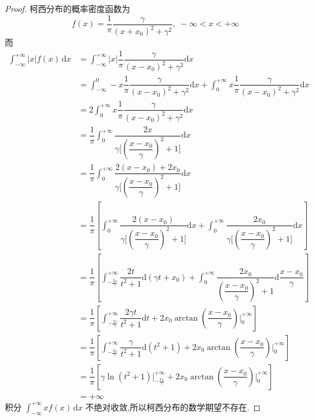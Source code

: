 \begin{proof}
    柯西分布的概率密度函数为
    $$
    f(x) = \dfrac{1}{\pi} \dfrac{\gamma}{(x + x_0)^2 + \gamma^2},\; -\infty < x < +\infty
    $$
    而
    $$
    \begin{aligned}
        \int_{-\infty}^{+\infty} |x| f(x)\,\text{d}x &= \int_{-\infty}^{+\infty} |x| \dfrac{1}{\pi} \dfrac{\gamma}{(x - x_0)^2 + \gamma^2} \text{d}x \\
        &= \int_{-\infty}^{0} -x \dfrac{1}{\pi} \dfrac{\gamma}{(x - x_0)^2 + \gamma^2} \text{d}x + \int_{0}^{+\infty} x \dfrac{1}{\pi} \dfrac{\gamma}{(x - x_0)^2 + \gamma^2} \text{d}x \\
        &= 2 \int_{0}^{+\infty} x \dfrac{1}{\pi} \dfrac{\gamma}{(x - x_0)^2 + \gamma^2} \text{d}x \\
        &= \dfrac{1}{\pi} \int_{0}^{+\infty} \dfrac{2x}{\gamma \big[(\dfrac{x - x_0}{\gamma})^2 + 1 \big]} \text{d}x \\
        &= \dfrac{1}{\pi} \int_{0}^{+\infty} \dfrac{2(x - x_0) + 2x_0}{\gamma \big[(\dfrac{x - x_0}{\gamma})^2 + 1 \big]} \text{d}x \\
        &= \dfrac{1}{\pi} \left[ \int_{0}^{+\infty} \dfrac{2(x - x_0)}{\gamma \big[ (\dfrac{x - x_0}{\gamma})^2 + 1 \big]} \text{d}x + \int_{0}^{+\infty} \dfrac{2x_0}{\gamma \big[(\dfrac{x - x_0}{\gamma})^2 + 1 \big]} \text{d}x \right] \\
        &= \dfrac{1}{\pi} \left[ \int_{-\frac{x_0}{\gamma}}^{+\infty} \dfrac{2t}{t^2 + 1} \text{d}(\gamma t + x_0) + \int_{0}^{+\infty} \dfrac{2x_0}{(\dfrac{x - x_0}{\gamma})^2 + 1} \text{d} \dfrac{x - x_0}{\gamma} \right] \\
        &= \dfrac{1}{\pi} \left[ \int_{-\frac{x_0}{\gamma}}^{+\infty} \dfrac{2 \gamma t}{t^2 + 1} \text{d}t + 2x_0 \arctan(\dfrac{x - x_0}{\gamma}) \Big|_0^{+\infty} \right] \\
        &= \dfrac{1}{\pi} \left[ \int_{-\frac{x_0}{\gamma}}^{+\infty} \dfrac{\gamma}{t^2 + 1} \text{d} (t^2 + 1) + 2x_0 \arctan(\dfrac{x - x_0}{\gamma}) \Big|_0^{+\infty} \right] \\
        &= \dfrac{1}{\pi} \left[ \gamma \ln(t^2 + 1) \Big|_{-\frac{x_0}{\gamma}}^{+\infty} + 2x_0 \arctan(\dfrac{x - x_0}{\gamma}) \Big|_0^{+\infty} \right] \\
        &= +\infty
    \end{aligned}
    $$
    积分 $\displaystyle\int_{-\infty}^{+\infty} x f(x)\,\text{d}x$ 不绝对收敛,所以柯西分布的数学期望不存在.
\end{proof}

